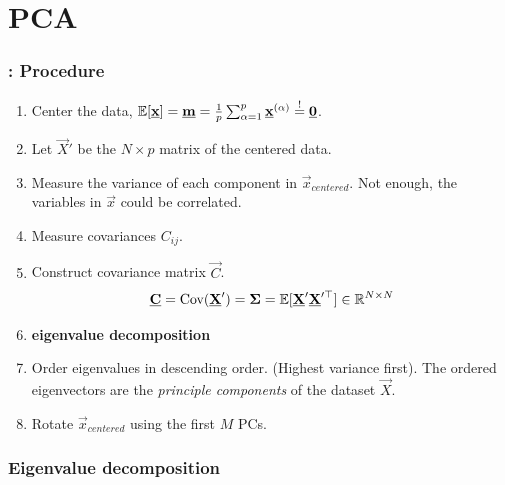 \section{PCA}


\begin{frame}\frametitle{\secname: Procedure}

\begin{enumerate}
	\item Center the data, $\mathbb{E}\lbrack\underline{\mathbf{x}}\rbrack = \underline{\mathbf{m}}  = \frac{1}{p} \sum_{\alpha=1}^{p} \underline{\mathbf{x}}^{(\alpha)}\stackrel{\mathrm{!}}{=} \underline{\mathbf{0}}$.
	\item Let $\vec X'$ be the $N \times p$ matrix of the centered data.
	\item Measure the variance of each component in $\vec x_{\mathit{centered}}$. Not enough, the variables in $\vec x$ could be correlated.
	\item Measure covariances $C_{ij}$.
	\item Construct covariance matrix $\vec C$.
		\begin{equation}
		\underline{\mathbf{C}} = \text{Cov}(\underline{\mathbf{X}}') = \mathbf{\Sigma} = \mathbb{E}[\underline{\mathbf{X}}' \underline{\mathbf{X}}'^\top] \in \mathbb{R}^{N \times N}
		\end{equation}
	\item \textbf{eigenvalue decomposition}
	\item Order eigenvalues in descending order. (Highest variance first). The ordered eigenvectors are the \emph{principle components} of the dataset $\vec X$.
	\item Rotate $\vec x_{\mathit{centered}}$ using the first $M$ PCs.
\end{enumerate}


\end{frame}

\subsubsection{Eigenvalue decomposition}

